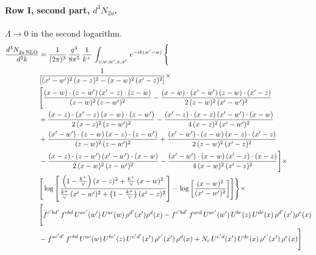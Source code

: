 \documentclass[10pt]{article}
\numberwithin{equation}{section}
\begin{document}
\paragraph{Row I, second part, $d^3N_{2a}$.}
$\Lambda\to0$ in the second logarithm.
\begin{align}
    \frac{d^{3}N_{2a\,\rm NLO}^{\rm}}{d^{3}k}  & =  \frac{1}{(2\pi)^{3}}\, \frac{g^{4}}{8\pi^{5}}\,\frac{1}{k^{+}}\,\int_{z,w,w^{\prime},x,x'}\, e^{-ik(w^{\prime}-w)}\, \Bigg\{\notag \\
& \frac{1}{\left[(x'-w')^{2}\, (x-z)^{2}-(x-w)^{2}\, (x'-z)^{2}\right]}\times\,\notag \\ & \Bigg[\frac{(x-w)\cdot (z-w')\, (x'-z)\cdot (z-w)}{(z-w)^{2}\,(z-w')^{2}}-\frac{(x-w)\cdot (x'-w')\, (z-w)\cdot (x'-z)}{2\, (z-w)^{2}\, (x'-w')^{2}}\notag \\ & + \frac{(x-z)\cdot (x'-z)\, (x-w)\cdot (z-w')}{2\, (x-z)^{2}\, (z-w')^{2}}-\frac{(x'-z)\cdot (x-z)\, (x'-w')\cdot (x-w)}{4\, (x-z)^{2}\, (x'-w')^{2}}\notag \\ & + \frac{(x'-w')\cdot (z-w)\, (x-z)\cdot (z-w')}{(z-w)^{2}\,(z-w')^{2}}+\frac{(x'-w')\cdot (z-w)\, (x-z)\cdot (x'-z)}{2\, (z-w)^{2}\, (x'-z)^{2}}\notag \\ & - \frac{(x-z)\cdot (z-w')\, (x'-w')\cdot (x-w)}{2\, (x-w)^{2}\, (z-w')^{2}} -\frac{(x'-w')\cdot (x-w)\, (x'-z)\cdot (x-z)}{4\, (x-w)^{2}\, (x'-z)^{2}}\Bigg]\times\notag \\ &  \Bigg[\log{\left[\frac{\left(1-\frac{k^{+}}{\vee}\right)(x-z)^{2}+\frac{k^{+}}{\vee}\,(x-w)^{2}}{\frac{k^{+}}{\vee}\, (x'-w')^{2} + \left(1-\frac{k^{+}}{\vee}\right) (x'-z)^{2}}\right]}-\log{\left[\frac{(x-w)^{2}}{(x'-w')^{2}}\right]}\Bigg]\Bigg\} \times\, \notag \\ & \Bigg[f^{c'bd'}\,f^{cbd}\, U^{ac'}(w')\,U^{ac}(w)\,\rho^{d'}(x')\rho^{d}(x)- f^{c'bd'}\,f^{acd}\,U^{ac'}(w')\,U^{bc}(z)\,U^{de}(x)\,\rho^{d'}(x')\rho^{e}(x) \notag \\ & -f^{ac'd'}\,f^{cbd}\,U^{ac}(w)\,U^{bc'}(z)\,U^{e'd'}(x')\,\rho^{e'}(x')\,\rho^{d}(x) +N_{c}\,U^{e'd}(x')\,U^{de}(x)\,\rho^{e'}(x')\,\rho^{e}(x)\Bigg] \label{eq:F:G2I2a}
\end{align}
\end{document}

